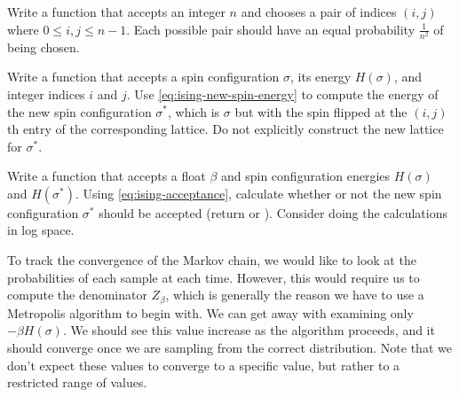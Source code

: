 \begin{problem} %
Write a function that accepts an integer $n$ and chooses a pair of indices $(i,j)$ where $0 \le i,j \le n-1$.
Each possible pair should have an equal probability $\frac{1}{n^2}$ of being chosen.
\label{prob:ising-flip-site}
\end{problem}

\begin{problem} %
Write a function that accepts a spin configuration $\sigma$, its energy $H(\sigma)$, and integer indices $i$ and $j$.
Use \eqref{eq:ising-new-spin-energy} to compute the energy of the new spin configuration $\sigma^*$, which is $\sigma$ but with the spin flipped at the $(i,j)$th entry of the corresponding lattice.
Do not explicitly construct the new lattice for $\sigma^*$.
\label{prob:ising-new-energy}
\end{problem}

\begin{problem} %
Write a function that accepts a float $\beta$ and spin configuration energies $H(\sigma)$ and $H(\sigma^*)$.
Using \eqref{eq:ising-acceptance}, calculate whether or not the new spin configuration $\sigma^*$ should be accepted (return  or ).
Consider doing the calculations in log space.
\label{prob:ising-acceptance}
\end{problem}

To track the convergence of the Markov chain, we would like to look at the probabilities of each sample at each time. However, this would require us to compute the denominator $Z_{\beta}$, which is generally the reason we have to use a Metropolis algorithm to begin with.
We can get away with examining only $-\beta H(\sigma)$.
We should see this value increase as the algorithm proceeds, and it should converge once we are sampling from the correct distribution.
Note that we don't expect these values to converge to a specific value, but rather to a restricted range of values.

